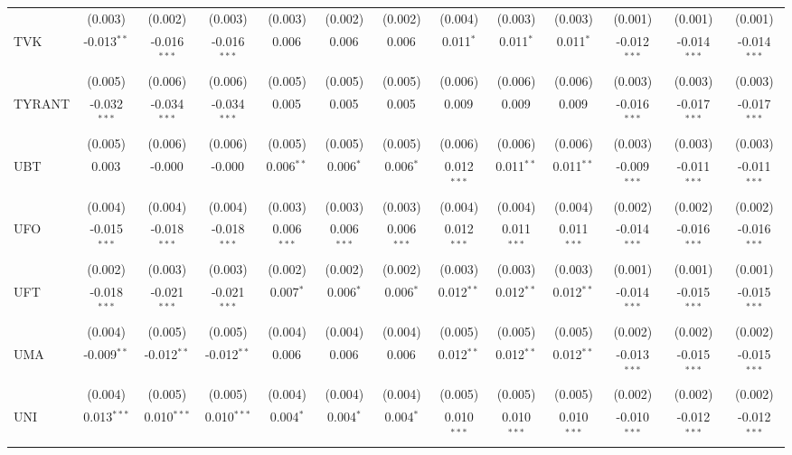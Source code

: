 \begin{table}[!htbp]
\begin{tabular}{@{\extracolsep{5pt}}lcccccccccccc}
  & (0.003) & (0.002) & (0.003) & (0.003) & (0.002) & (0.002) & (0.004) & (0.003) & (0.003) & (0.001) & (0.001) & (0.001) \\
 TVK & -0.013$^{**}$ & -0.016$^{***}$ & -0.016$^{***}$ & 0.006$^{}$ & 0.006$^{}$ & 0.006$^{}$ & 0.011$^{*}$ & 0.011$^{*}$ & 0.011$^{*}$ & -0.012$^{***}$ & -0.014$^{***}$ & -0.014$^{***}$ \\
  & (0.005) & (0.006) & (0.006) & (0.005) & (0.005) & (0.005) & (0.006) & (0.006) & (0.006) & (0.003) & (0.003) & (0.003) \\
 TYRANT & -0.032$^{***}$ & -0.034$^{***}$ & -0.034$^{***}$ & 0.005$^{}$ & 0.005$^{}$ & 0.005$^{}$ & 0.009$^{}$ & 0.009$^{}$ & 0.009$^{}$ & -0.016$^{***}$ & -0.017$^{***}$ & -0.017$^{***}$ \\
  & (0.005) & (0.006) & (0.006) & (0.005) & (0.005) & (0.005) & (0.006) & (0.006) & (0.006) & (0.003) & (0.003) & (0.003) \\
 UBT & 0.003$^{}$ & -0.000$^{}$ & -0.000$^{}$ & 0.006$^{**}$ & 0.006$^{*}$ & 0.006$^{*}$ & 0.012$^{***}$ & 0.011$^{**}$ & 0.011$^{**}$ & -0.009$^{***}$ & -0.011$^{***}$ & -0.011$^{***}$ \\
  & (0.004) & (0.004) & (0.004) & (0.003) & (0.003) & (0.003) & (0.004) & (0.004) & (0.004) & (0.002) & (0.002) & (0.002) \\
 UFO & -0.015$^{***}$ & -0.018$^{***}$ & -0.018$^{***}$ & 0.006$^{***}$ & 0.006$^{***}$ & 0.006$^{***}$ & 0.012$^{***}$ & 0.011$^{***}$ & 0.011$^{***}$ & -0.014$^{***}$ & -0.016$^{***}$ & -0.016$^{***}$ \\
  & (0.002) & (0.003) & (0.003) & (0.002) & (0.002) & (0.002) & (0.003) & (0.003) & (0.003) & (0.001) & (0.001) & (0.001) \\
 UFT & -0.018$^{***}$ & -0.021$^{***}$ & -0.021$^{***}$ & 0.007$^{*}$ & 0.006$^{*}$ & 0.006$^{*}$ & 0.012$^{**}$ & 0.012$^{**}$ & 0.012$^{**}$ & -0.014$^{***}$ & -0.015$^{***}$ & -0.015$^{***}$ \\
  & (0.004) & (0.005) & (0.005) & (0.004) & (0.004) & (0.004) & (0.005) & (0.005) & (0.005) & (0.002) & (0.002) & (0.002) \\
 UMA & -0.009$^{**}$ & -0.012$^{**}$ & -0.012$^{**}$ & 0.006$^{}$ & 0.006$^{}$ & 0.006$^{}$ & 0.012$^{**}$ & 0.012$^{**}$ & 0.012$^{**}$ & -0.013$^{***}$ & -0.015$^{***}$ & -0.015$^{***}$ \\
  & (0.004) & (0.005) & (0.005) & (0.004) & (0.004) & (0.004) & (0.005) & (0.005) & (0.005) & (0.002) & (0.002) & (0.002) \\
 UNI & 0.013$^{***}$ & 0.010$^{***}$ & 0.010$^{***}$ & 0.004$^{*}$ & 0.004$^{*}$ & 0.004$^{*}$ & 0.010$^{***}$ & 0.010$^{***}$ & 0.010$^{***}$ & -0.010$^{***}$ & -0.012$^{***}$ & -0.012$^{***}$ \\

\end{tabular}
\end{table}
